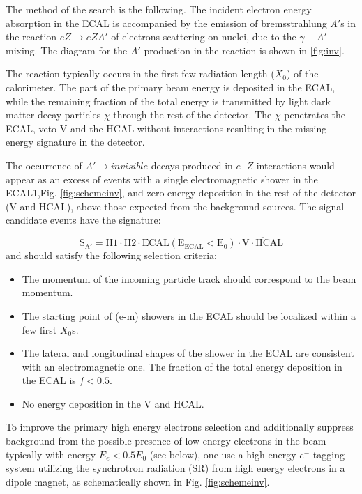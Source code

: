 The method of the search is the following. The incident electron energy absorption in the ECAL is accompanied by the
emission of bremsstrahlung $A'$s in the reaction $eZ\rightarrow eZA'$ of electrons scattering on nuclei, due to the
$\gamma - A'$ mixing. The diagram for the $A'$ production in the reaction is shown in \ref{fig:inv}.\par

The reaction typically occurs in the first few radiation length ($X_0$) of the calorimeter. The part of the primary beam
energy is deposited in the ECAL, while the remaining fraction of the total energy is transmitted by light dark matter
decay particles $\chi$ through the rest of the detector. The $\chi$ penetrates the ECAL, veto V and the HCAL without
interactions resulting in the missing-energy signature in the detector.\par

The occurrence of $A'\rightarrow invisible$ decays produced in $e^-Z$ interactions would appear as an excess of events
with a single electromagnetic shower in the ECAL1,Fig. \ref{fig:schemeinv}, and zero energy deposition in the rest of
the detector (V and HCAL), above those expected from the background sources. The signal candidate events have the
signature:\par



\begin{equation}
\mathrm{ S_{A'} = H1 \cdot H2\cdot ECAL (E_{ECAL}<E_0)\cdot \overline{V\cdot HCAL}}
\end{equation}
and should satisfy the following selection criteria:
\begin{itemize}
\item The momentum of the incoming particle track should correspond to the beam momentum.
\item The starting point of (e-m) showers in the ECAL should be localized within a few first $X_0$s.
\item The lateral and longitudinal shapes of the shower in the ECAL are consistent with an electromagnetic one. The
fraction of the total energy deposition in the ECAL is $f<0.5$.
\item No energy deposition in the V and HCAL.
\end{itemize}

To improve the primary high energy electrons selection and additionally suppress background from the possible presence
of low energy electrons in the beam typically with energy $E_e <0.5 E_0$ (see below), one use a high energy $e^-$ tagging
system utilizing the synchrotron radiation (SR) from high energy electrons in a dipole magnet, as schematically shown in
Fig. \ref{fig:schemeinv}. 




